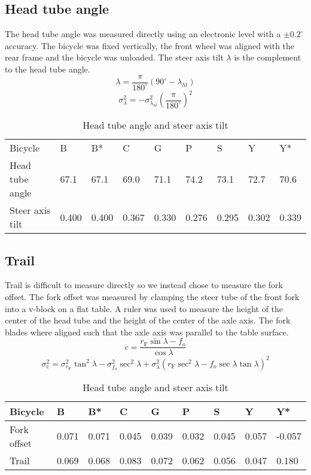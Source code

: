 \documentclass{bmd2010p}
\begin{document}
\subsection{Head tube angle}
The head tube angle was measured directly using an electronic level with a
$\pm0.2^{\circ}$ accuracy. The bicycle was fixed vertically, the front wheel
was aligned with the rear frame and the bicycle was unloaded. The steer axis
tilt $\lambda$ is the complement to the head tube angle.
\begin{equation}
    \lambda=\frac{\pi}{180^{\circ}}(90^{\circ}-\lambda_{ht})
\label{eq:headTubeAngle}
\end{equation}
\begin{equation}
    \sigma_\lambda^{2}=-\sigma_{\lambda_{ht}}^{2}\left(\frac{\pi}{180^\circ}\right)^2
    \label{eq:HeadTubeAngleVar}
\end{equation}
\begin{table}
	\begin{tabular}{lllllllll}
    \hline
	Bicycle   & B      & B*     & C      & G      & P      & S      & Y      & Y*\\
	Head tube angle & 67.1 & 67.1 & 69.0 & 71.1 & 74.2 & 73.1 & 72.7 & 70.6\\
	Steer axis tilt & 0.400 & 0.400 & 0.367 & 0.330 & 0.276 & 0.295 & 0.302 & 0.339
	\end{tabular}
	\caption{Head tube angle and steer axis tilt}
	\label{tab:lambda}
\end{table}

\subsection{Trail}
Trail is difficult to measure directly so we instead chose to measure the fork
offset. The fork offset was measured by clamping the steer tube of the front
fork into a v-block on a flat table. A ruler was used to measure the height of
the center of the head tube and the height of the center of the axle axis. The
fork blades where aligned such that the axle axis was parallel to the table
surface.
\begin{equation}
	c=\frac{r_\mathrm{F}\sin{\lambda}-f_o}{\cos{\lambda}}
	\label{eq:trail}
\end{equation}
\begin{equation}
    \sigma_{c}^{2}=\sigma_{r_{\mathrm{F}}}^{2}\tan^2{\lambda} -
    \sigma_{f_o}^{2}\sec^2{\lambda} +
    \sigma_{\lambda}^{2}\left(r_\mathrm{F}\sec^2{\lambda} -
    f_o\sec{\lambda}\tan{\lambda}\right)^2
    \label{eq:TrailVar}
\end{equation}
\begin{table}
	\begin{tabular}{lllllllll}
	Bicycle     & B     & B*    & C     & G     & P     & S     & Y     & Y*\\
    \hline
	Fork offset & 0.071 & 0.071 & 0.045 & 0.039 & 0.032 & 0.045 & 0.057 & -0.057\\
	Trail       & 0.069 & 0.068 & 0.083 & 0.072 & 0.062 & 0.056 & 0.047 & 0.180
	\end{tabular}
	\caption{Head tube angle and steer axis tilt}
	\label{tab:trail}
\end{table}
\end{document}
